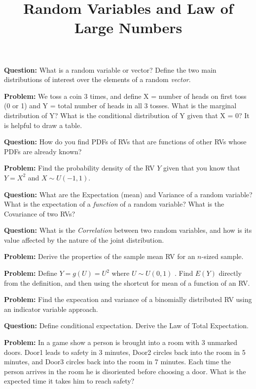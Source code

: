




\title{Random Variables and Law of Large Numbers}
\date{}
\maketitle

\textbf{Question:} What is a random variable or vector? Define the two main distributions of interest over the elements of a random \textit{vector}.\n

\textbf{Problem:} We toss a coin 3 times, and define X = number of heads on first toss (0 or 1) and Y = total number of heads in all 3 tosses. What is the marginal distribution of Y? What is the conditional distribution of Y given that X = 0? It is helpful to draw a table.\n

\textbf{Question:} How do you find PDFs of RVs that are functions of other RVs whose PDFs are already known?\n

\textbf{Problem:} Find the probability density of the RV $Y$ given that you know that $Y=X^2$ and $X\sim U(-1,1)$.\n

\textbf{Question:} What are the Expectation (mean) and Variance of a random variable? What is the expectation of a \emph{function} of a random variable? What is the Covariance of two RVs?\n

\textbf{Question:} What is the \emph{Correlation} between two random variables, and how is its value affected by the nature of the joint distribution.\n

\textbf{Problem:} Derive the properties of the sample mean RV for an $n$-sized sample.\n

\textbf{Problem:} Define $Y = g(U) =U^2$ where $U \sim U(0,1)$ . Find $E(Y)$ directly from the definition, and then using the shortcut for mean of a function of an RV.\n

\textbf{Problem:} Find the expecation and variance of a binomially distributed RV using an indicator variable approach.\n

\textbf{Question:} Define conditional expectation. Derive the Law of Total Expectation.\n

\textbf{Problem:} In a game show a person is brought into a room with 3 unmarked doors. Door1 leads to safety in 3 minutes, Door2 circles back into the room in 5 minutes, and Door3 circles back into the room in 7 minutes. Each time the person arrives in the room he is disoriented before choosing a door. What is the expected time it takes him to reach safety?\n

